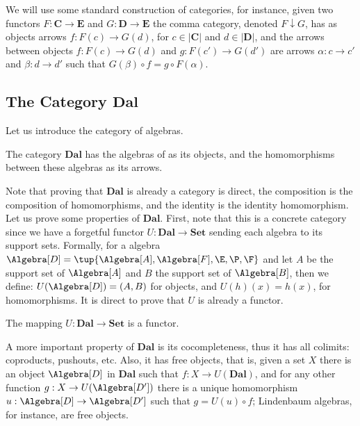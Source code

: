 We will use some standard construction of categories, for instance, given two functors $F: \mathbf{C} \rightarrow \mathbf{E}$ and $G: \mathbf{D} \rightarrow \mathbf{E}$ the comma category, denoted $F \downarrow G$, has as objects arrows $f: F(c) \rightarrow G(d)$,  for $c \in |\mathbf{C}|$ and $d \in |\mathbf{D}|$,  and the arrows between objects $f:  F(c) \rightarrow G(d)$ and $g : F(c') \rightarrow G(d')$ are arrows $\alpha : c \rightarrow c'$ and $\beta : d \rightarrow d'$ such that $G(\beta) \circ f = g \circ F(\alpha)$.
 
\subsection{The Category $\mathbf{Dal}$}

Let us  introduce the category of \DAL algebras.
\medskip
\begin{definition} The category $\mathbf{Dal}$ has  the  algebras of  as its objects, and 
the homomorphisms between these algebras as its arrows.
\end{definition}
\medskip
Note that proving that $\mathbf{Dal}$ is already a category is direct, the composition is the composition of homomorphisms, and the identity is the identity homomorphism.
Let us prove some properties of $\mathbf{Dal}$.  First,  note that this is a concrete category since we have a forgetful functor $U: \mathbf{Dal} \rightarrow \mathbf{Set}$ sending each \DAL algebra to its support sets. Formally,  for a \DAL algebra  $\Algebra[D]=\tup{\Algebra[A], \Algebra[F], \E, \P, \F}$ and let $A$ be the support set of $\Algebra[A]$ and $B$ the support set of $\Algebra[B]$,  then we define:
$U(\Algebra[D]) = (A,B)$ for objects, and $U(h)(x) = h(x)$, for homomorphisms.   
It is direct to prove that $U$ is already a functor.
\medskip
\begin{theorem} The mapping $U: \mathbf{Dal} \rightarrow \mathbf{Set}$ is a functor.
\end{theorem}
\medskip
A more important property of  $\mathbf{Dal}$ is its cocompleteness,  thus it has all colimits: coproducts, pushouts, etc.  Also, it has free objects, that is,  given a set $X$ there is an object $\Algebra[D]$ in $\mathbf{Dal}$ such that   $f: X \rightarrow U(\mathbf{Dal})$, and for any other function $g : X \rightarrow U(\Algebra[D'])$ there is a unique homomorphism $u : \Algebra[D] \rightarrow \Algebra[D']$ such that 
$g = U(u) \circ f$; Lindenbaum algebras, for instance, are free objects. 

